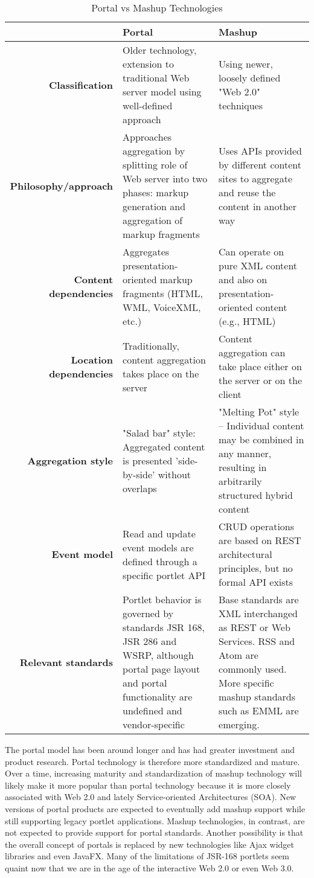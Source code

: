 		\begin{table}[H]
		\centering
		\begin{tabular}{|r|L{5cm}|L{5cm}|}
		\hline
				                       & \textbf{Portal} & \textbf{Mashup} \\
		\hline 
		\textbf{Classification}   & Older technology, extension to traditional Web server model using well-defined approach & Using newer, loosely defined "Web 2.0" techniques \\
		\hline
		\textbf{Philosophy/approach}       & Approaches aggregation by splitting role of Web server into two phases: markup generation and aggregation of markup fragments & Uses APIs provided by different content sites to aggregate and reuse the content in another way \\
		\hline
		\textbf{Content dependencies}	   & Aggregates presentation-oriented markup fragments (HTML, WML, VoiceXML, etc.) & Can operate on pure XML content and also on presentation-oriented content (e.g., HTML) \\
		\hline
		\textbf{Location dependencies}  & Traditionally, content aggregation takes place on the server & Content aggregation can take place either on the server or on the client \\
		\hline
		\textbf{Aggregation style}		   & "Salad bar" style: Aggregated content is presented 'side-by-side' without overlaps & "Melting Pot" style – Individual content may be combined in any manner, resulting in arbitrarily structured hybrid content \\
		\hline
		\textbf{Event model}		       & Read and update event models are defined through a specific portlet API & CRUD operations are based on REST architectural principles, but no formal API exists \\
		\hline
		\textbf{Relevant standards}		   & Portlet behavior is governed by standards JSR 168, JSR 286 and WSRP, although portal page layout and portal functionality are undefined and vendor-specific & Base standards are XML interchanged as REST or Web Services. RSS and Atom are commonly used. More specific mashup standards such as EMML are emerging. \\
		\hline
		\end{tabular}
		\caption[Portal vs Mashup Technology]{Portal vs Mashup Technologies}
		\label{tab:Portal_Mashup}
		\end{table}
		
	The portal model has been around longer and has had greater investment and product research. Portal technology is therefore more standardized and mature. Over a time, increasing maturity and standardization of mashup technology will likely make it more popular than portal technology because it is more closely associated with Web 2.0 and lately Service-oriented Architectures (SOA). New versions of portal products are expected to eventually add mashup support while still supporting legacy portlet applications. Mashup technologies, in contrast, are not expected to provide support for portal standards. Another possibility is that the overall concept of portals is replaced by new technologies like Ajax widget libraries and even JavaFX. Many of the limitations of JSR-168 portlets seem quaint now that we are in the age of the interactive Web 2.0 or even Web 3.0.

